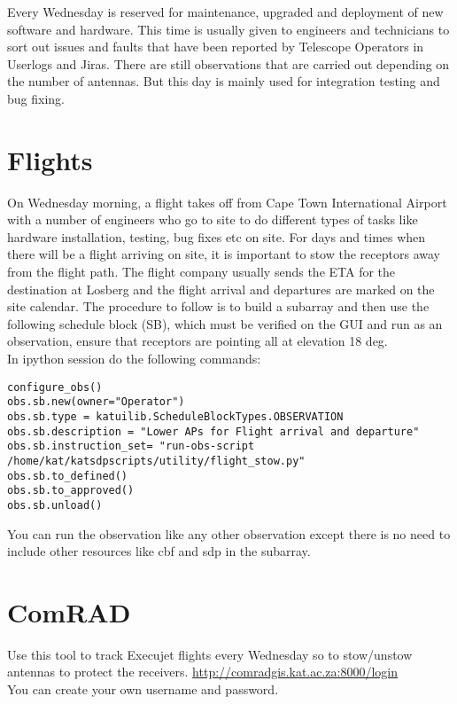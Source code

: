 Every Wednesday is reserved for maintenance, upgraded and deployment of new software and hardware. This time is usually given to engineers and technicians to sort out issues and faults that have been reported by Telescope Operators in Userlogs and Jiras.  There are still observations that are carried out depending on the number of antennas. But this day is mainly used for integration testing and bug fixing. 
\section{ Flights}
On Wednesday morning, a flight takes off from Cape Town International Airport with a number of engineers who go to site to do different types of tasks like hardware installation, testing, bug fixes etc on site. For days and times when there will be a flight arriving on site, it is important to stow the receptors away from the flight path. The flight company usually sends the ETA for the destination at Losberg and the flight arrival and departures are marked on the site calendar. The procedure to follow is to build a subarray and then use the  following schedule block (SB), which must be verified on the GUI and run as an observation, ensure that receptors are pointing all at elevation 18 deg.\\
In ipython session do the following commands:

\begin{lstlisting}[style=DOS]
configure_obs()
obs.sb.new(owner="Operator") 
obs.sb.type = katuilib.ScheduleBlockTypes.OBSERVATION
obs.sb.description = "Lower APs for Flight arrival and departure" 
obs.sb.instruction_set= "run-obs-script /home/kat/katsdpscripts/utility/flight_stow.py"
obs.sb.to_defined()
obs.sb.to_approved()
obs.sb.unload()
\end{lstlisting}

You can run the observation like any other observation except there is no need to include other resources like cbf and sdp in the subarray. 

\section{ ComRAD}

Use this tool to track Execujet flights every Wednesday so to stow/unstow antennas to protect the receivers\cite{ComRAD}.
\url{http://comradgis.kat.ac.za:8000/login}\\
You can create your own username and password. 
